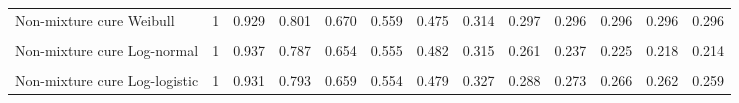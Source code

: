 \documentclass[
]{article}
\begin{document}
\begin{table}[H]
{\begin{tabular}[t]{lrrrrrrrrrrrr}
Non-mixture cure Weibull & 1 & 0.929 & 0.801 & 0.670 & 0.559 & 0.475 & 0.314 & 0.297 & 0.296 & 0.296 & 0.296 & 0.296\\
\cellcolor{gray!10}{Mixture cure Log-normal} & \cellcolor{gray!10}{1} & \cellcolor{gray!10}{0.936} & \cellcolor{gray!10}{0.790} & \cellcolor{gray!10}{0.658} & \cellcolor{gray!10}{0.556} & \cellcolor{gray!10}{0.479} & \cellcolor{gray!10}{0.295} & \cellcolor{gray!10}{0.238} & \cellcolor{gray!10}{0.215} & \cellcolor{gray!10}{0.205} & \cellcolor{gray!10}{0.200} & \cellcolor{gray!10}{0.197}\\
Non-mixture cure Log-normal & 1 & 0.937 & 0.787 & 0.654 & 0.555 & 0.482 & 0.315 & 0.261 & 0.237 & 0.225 & 0.218 & 0.214\\
\cellcolor{gray!10}{Mixture cure Log-logistic} & \cellcolor{gray!10}{1} & \cellcolor{gray!10}{0.931} & \cellcolor{gray!10}{0.793} & \cellcolor{gray!10}{0.658} & \cellcolor{gray!10}{0.553} & \cellcolor{gray!10}{0.477} & \cellcolor{gray!10}{0.318} & \cellcolor{gray!10}{0.275} & \cellcolor{gray!10}{0.258} & \cellcolor{gray!10}{0.250} & \cellcolor{gray!10}{0.246} & \cellcolor{gray!10}{0.243}\\
Non-mixture cure Log-logistic & 1 & 0.931 & 0.793 & 0.659 & 0.554 & 0.479 & 0.327 & 0.288 & 0.273 & 0.266 & 0.262 & 0.259\\
\bottomrule
\end{tabular}}
\end{table}
\end{document}
